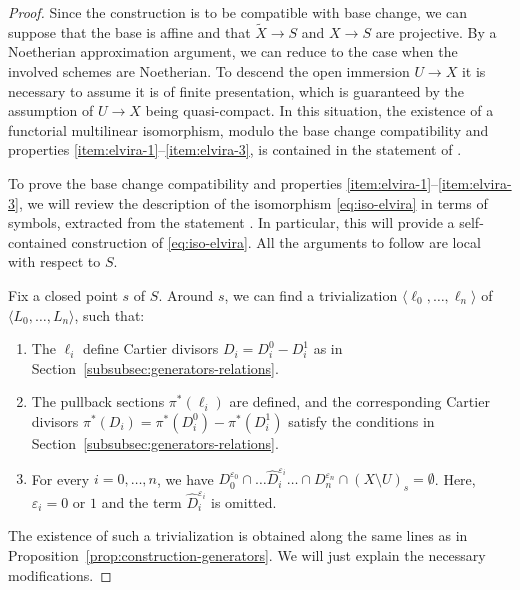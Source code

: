 \documentclass[JEP,XML,SOM,Unicode,published]{cedram}
\let\epsilon\varepsilon
\theoremstyle{plain}
\theoremstyle{definition}
\begin{document}
\begin{proof}
Since the construction is to be compatible with base change, we can suppose that the base is affine and that $\widetilde{X} \to S$ and $X\to S$ are projective. By a Noetherian approximation argument, we can reduce to the case when the involved schemes are Noetherian. To descend the open immersion $U \to X$ it is necessary to assume it is of finite presentation, which is guaranteed by the assumption of $U \to X$ being quasi-compact. In this situation, the existence of a functorial multilinear isomorphism, modulo the base change compatibility and properties \eqref{item:elvira-1}--\eqref{item:elvira-3}, is contained in the statement of \cite[Th.\,5.3.1]{Munoz}.

To prove the base change compatibility and properties \eqref{item:elvira-1}--\eqref{item:elvira-3}, we will review the description of the isomorphism \eqref{eq:iso-elvira} in terms of symbols, extracted from the statement \cite[Th.\,5.3.1]{Munoz}. In particular, this will provide a self-contained construction of \eqref{eq:iso-elvira}. All the arguments to follow are local with respect to $S$.

Fix a closed point $s$ of $S$. Around $s$, we can find a trivialization $\langle\ell_{0},\ldots,\ell_{n}\rangle$ of $\langle L_{0},\ldots, L_{n}\rangle$, such that:
\begin{enumerate}
\item[(a)] The $\ell_{i}$ define Cartier divisors $D_{i}=D_{i}^{0}-D_{i}^{1}$ as in Section~\ref{subsubsec:generators-relations}.
\item[(b)] The pullback sections $\pi^{\ast}(\ell_{i})$ are defined, and the corresponding Cartier divisors $\pi^{\ast}(D_{i})=\pi^{\ast}(D_{i}^{0})-\pi^{\ast}(D_{i}^{1})$ satisfy the conditions in Section~\ref{subsubsec:generators-relations}.
\item[(c)] For every $i=0,\ldots, n$, we have $D_{0}^{\epsilon_{0}}\cap\ldots\widehat{D}_{i}^{\epsilon_{i}}\ldots\cap D_{n}^{\epsilon_{n}}\cap (X\setminus U)_{s}=\emptyset$. Here, $\epsilon_{i}=0$ or $1$ and the term $\widehat{D}_{i}^{\epsilon_{i}}$ is omitted.
\end{enumerate}
The existence of such a trivialization is obtained along the same lines as in Proposition~\ref{prop:construction-generators}. We will just explain the necessary modifications.


\end{proof}
\end{document}
